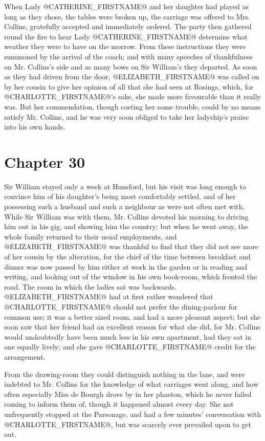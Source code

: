 When Lady @CATHERINE_FIRSTNAME@ and her daughter had played as long as they chose,
the tables were broken up, the carriage was offered to Mrs. Collins,
gratefully accepted and immediately ordered. The party then gathered
round the fire to hear Lady @CATHERINE_FIRSTNAME@ determine what weather they were
to have on the morrow. From these instructions they were summoned by
the arrival of the coach; and with many speeches of thankfulness on Mr.
Collins's side and as many bows on Sir William's they departed. As soon
as they had driven from the door, @ELIZABETH_FIRSTNAME@ was called on by her cousin
to give her opinion of all that she had seen at Rosings, which, for
@CHARLOTTE_FIRSTNAME@'s sake, she made more favourable than it really was. But her
commendation, though costing her some trouble, could by no means satisfy
Mr. Collins, and he was very soon obliged to take her ladyship's praise
into his own hands.



\chapter*{Chapter 30}


Sir William stayed only a week at Hunsford, but his visit was long
enough to convince him of his daughter's being most comfortably settled,
and of her possessing such a husband and such a neighbour as were not
often met with. While Sir William was with them, Mr. Collins devoted his
morning to driving him out in his gig, and showing him the country; but
when he went away, the whole family returned to their usual employments,
and @ELIZABETH_FIRSTNAME@ was thankful to find that they did not see more of her
cousin by the alteration, for the chief of the time between breakfast
and dinner was now passed by him either at work in the garden or in
reading and writing, and looking out of the window in his own book-room,
which fronted the road. The room in which the ladies sat was backwards.
@ELIZABETH_FIRSTNAME@ had at first rather wondered that @CHARLOTTE_FIRSTNAME@ should not prefer
the dining-parlour for common use; it was a better sized room, and had a
more pleasant aspect; but she soon saw that her friend had an excellent
reason for what she did, for Mr. Collins would undoubtedly have been
much less in his own apartment, had they sat in one equally lively; and
she gave @CHARLOTTE_FIRSTNAME@ credit for the arrangement.

From the drawing-room they could distinguish nothing in the lane, and
were indebted to Mr. Collins for the knowledge of what carriages went
along, and how often especially Miss de Bourgh drove by in her phaeton,
which he never failed coming to inform them of, though it happened
almost every day. She not unfrequently stopped at the Parsonage, and
had a few minutes' conversation with @CHARLOTTE_FIRSTNAME@, but was scarcely ever
prevailed upon to get out.

